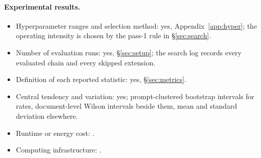 \paragraph{Experimental results.}
\begin{itemize}
  \item Hyperparameter ranges and selection method: yes, Appendix~\ref{app:hyper}; the operating intensity is chosen by the pass-1 rule in \S\ref{sec:search}.
  \item Number of evaluation runs: yes, \S\ref{sec:setup}; the search log records every evaluated chain and every skipped extension.
  \item Definition of each reported statistic: yes, \S\ref{sec:metrics}.
  \item Central tendency and variation: yes; prompt-clustered bootstrap intervals for rates, document-level Wilson intervals beside them, mean and standard deviation elsewhere.
  \item Runtime or energy cost: .
  \item Computing infrastructure: .
\end{itemize}
